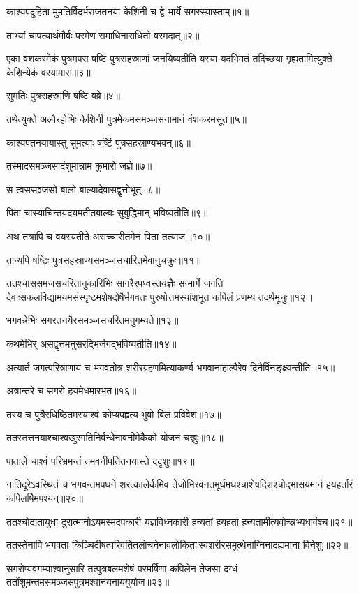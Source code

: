 

काश्यपदुहिता मुमतिर्विदर्भराजतनया केशिनी च द्वे भार्ये सगरस्यास्ताम्॥१॥

ताभ्यां चापत्यार्थमौर्वः परमेण समाधिनाराधितो वरमदात्॥२॥

एका वंशकरमेकं पुत्रमपरा षष्टिं पुत्रसहस्राणां जनयिष्यतीति यस्या यदभिमतं तदिच्छया
गृह्यतामित्युक्ते केशिन्येकं वरयामास॥३॥

सुमतिः पुत्रसहस्राणि षष्टिं वव्रे॥४॥

तथेत्युक्ते अल्पैरहोभिः केशिनी पुत्रमेकमसमञ्जसनामानं वंशकरमसूत॥५॥

काश्यपतनयायास्तु सुमत्याः षष्टिं पुत्रसहस्राण्यभवन्॥६॥

तस्मादसमञ्जसादंशुमान्नाम कुमारो जज्ञे॥७॥

स त्वससञ्जसो बालो बाल्यादेवासद्वृत्तोभूत्॥८॥

पिता चास्याचिन्तयदयमतीतबाल्यः सुबुद्धिमान् भविष्यतीति॥९॥

अथ तत्रापि च वयस्यतीते असच्चारीतमेनं पिता तत्याज॥१०॥

तान्यपि षष्टिः पुत्रसहस्राण्यसमञ्जसचारितमेवानुचक्रुः॥११॥

ततश्चाससमजसचरितानुकारिभिः सागरैरपध्वस्तयज्ञैः सन्मार्गे जगति
देवाःसकलविद्यामयमसंस्पृष्टमशेषदोषैर्भगवतः पुरुषोत्तमस्यांशभूत कपिलं प्रणम्य तदर्थमूचुः॥१२॥

भगवन्नेभिः सगरतनयैरसमञ्जसचरितमनुगम्यते॥१३॥

कथमेभिर् असद्वृत्तमनुसरद्भिर्जगद्भविष्यतीति॥१४॥

अत्यार्त जगत्परित्राणाय च भगवतोत्र शरीरग्रहणमित्याकर्ण्य भगवानाहाल्पैरेव
दिनैर्विनङ्क्ष्यन्तीति॥१५॥

अत्रान्तरे च सगरो हयमेधमारभत॥१६॥

तस्य च पुत्रैरधिष्ठितमस्याश्वं कोप्यपहृत्य भुवो बिलं प्रविवेश॥१७॥

ततस्तत्तनयाश्चाश्वखुरगतिनिर्वन्धेनावनीमेकैको योजनं चख्नुः॥१८॥

पाताले चाश्वं परिभ्रमन्तं तमवनीपतितनयास्ते ददृशुः॥१९॥

नातिदूरेऽवस्थितं च भगवन्तमपघने शरत्कालेर्कमिव तेजोभिरवनतमूर्धमधश्चाशेषदिशश्चोद्भासयमानं
हयहर्तारं कपिलर्षिमपश्यन्॥२०॥

ततश्चोद्यतायुधा दुरात्मानोऽयमस्मदपकारी यज्ञविध्नकारी हन्यतां हयहर्ता
हन्यतामीत्यवोच्न्नभ्यधावंश्च॥२१॥

ततस्तेनापि भगवता किञ्चिदीषत्परिवर्तितलोचनेनावलोकिताःस्वशरीरसमुत्थेनाग्निनादह्यमाना
विनेशुः॥२२॥

सगरोप्यवगम्याश्वानुसारि तत्पुत्रबलमशेषं परमर्षिणा कपिलेन तेजसा दग्धं
ततोंशुमन्तमसमञ्जसपुत्रमश्वानयनाययुयोज॥२३॥

